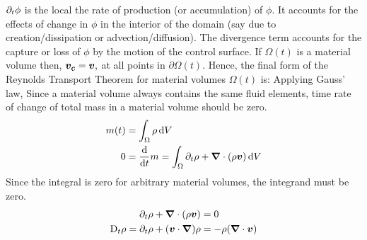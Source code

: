 $\partial_{t}\phi$ is the local the rate of production (or accumulation) of $\phi.$ It accounts for the effects of change in $\phi$ in the interior of the domain (say due to creation/dissipation or advection/diffusion). The divergence term accounts for the capture or loss of $\phi$ by the motion of the control surface. If $\Omega(t)$ is a material volume then, $\boldsymbol{v_c}=\boldsymbol{v},$ at all points in $\partial\Omega(t)$. Hence, the final form of the Reynolds Transport Theorem for material volumes $\Omega(t)$ is:
Applying Gauss' law,
Since a material volume always contains the same fluid elements, time rate of change of total mass in a material volume should be zero.
\begin{equation}
\begin{split}
    m(t) &= \int_{\Omega}\rho\,\mathrm{d} V \\
    0 &= \dfrac{\mathrm{d}}{\mathrm{d} t}m = \int_{\Omega}\partial_{t}\rho +
    \boldsymbol{\nabla}\cdot(\rho\boldsymbol{v}) \,\mathrm{d} V
\end{split}
\end{equation}
Since the integral is zero for arbitrary material volumes, the integrand must be zero.
\begin{equation}
\begin{split}
    \partial_{t}\rho + \boldsymbol{\nabla}\cdot(\rho\boldsymbol{v}) &= 0 \\
    \mathrm{D}_{t}\rho = \partial_{t}\rho + (\boldsymbol{v}\cdot\boldsymbol{\nabla})\rho &= -\rho(\boldsymbol{\nabla}\cdot\boldsymbol{v})
\end{split}
\end{equation}

